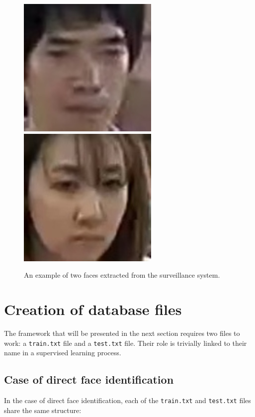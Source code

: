 \begin{figure}[!ht]
  \centering
  \includegraphics[scale=0.7]{figures/face1.jpg}
  \includegraphics[scale=0.7]{figures/face2.jpg}
  \caption[An example of two faces extracted from the surveillance system. On the left, one of the target individuals. On the right, a typical customer of the shopping center.]{An example of two faces extracted from the surveillance system.}
  \label{fig:face}
\end{figure}

\section{Creation of database files}

The framework that will be presented in the next section requires two files to work: a \texttt{train.txt} file and a \texttt{test.txt} file. Their role is trivially linked to their name in a supervised learning process.

\subsection{Case of direct face identification}
 In the case of direct face identification, each of the \texttt{train.txt} and \texttt{test.txt} files share the same structure:

